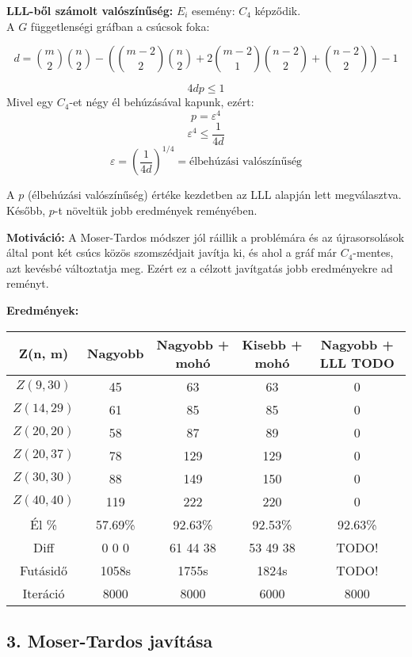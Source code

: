 \documentclass[12pt,a4paper]{article}
\begin{document}
\textbf{LLL-ből számolt valószínűség:} $E_i$ esemény: $C_4$ képződik.\\
        A $G$ függetlenségi gráfban a csúcsok foka:

        \[
        d = \binom{m}{2} \binom{n}{2} 
        - \left( 
        \binom{m-2}{2} \binom{n}{2} 
        + 2 \binom{m-2}{1} \binom{n-2}{2} 
        + \binom{n-2}{2} 
        \right) - 1
        \]
        
        \[
        4dp \leq 1
        \]
Mivel egy $C_4$-et négy él behúzásával kapunk, ezért:
        \[
         p = \varepsilon^4
        \]
        \[
        \varepsilon^4 \leq \frac{1}{4d}
        \]
        \[
        \varepsilon = \left( \frac{1}{4d} \right)^{1/4}=\text{élbehúzási valószínűség}
        \]

    A $p$ (élbehúzási valószínűség) értéke kezdetben az LLL alapján lett megválasztva. Később, $p$-t növeltük jobb eredmények reményében.

\textbf{Motiváció:} A Moser-Tardos módszer jól ráillik a problémára és az újrasorsolások által pont két csúcs közös szomszédjait javítja ki, és ahol a gráf már $C_4$-mentes, azt kevésbé változtatja meg. Ezért ez a célzott javítgatás jobb eredményekre ad reményt.

\textbf{Eredmények:}
\begin{table}[H]
\centering
\begin{tabular}{|c|c|c|c|c|}
\hline
\textbf{Z(n, m)} & \textbf{Nagyobb} & \textbf{Nagyobb + mohó} & \textbf{Kisebb + mohó} & \textbf{Nagyobb + LLL TODO} \\
\hline
$Z(9,30)$  & 45 & 63 & 63 & 0 \\
$Z(14, 29)$ & 61 & 85 & 85 & 0 \\
$Z(20, 20)$ & 58 & 87 & 89 & 0 \\
$Z(20, 37)$ & 78 & 129 & 129 & 0 \\
$Z(30, 30)$ & 88 & 149 & 150 & 0 \\
$Z(40, 40)$ & 119 & 222 & 220 & 0 \\
\hline
Él \% & 57.69\% & 92.63\% & 92.53\% & 92.63\%\\
\hline
Diff & 0 0 0 & 61 44 38 & 53 49 38 & TODO! \\
\hline
Futásidő & 1058s & 1755s & 1824s & TODO! \\
Iteráció & 8000 & 8000 & 6000 & 8000 \\
\hline
\end{tabular}
\end{table}

\subsection*{3. Moser-Tardos javítása}
\end{document}
